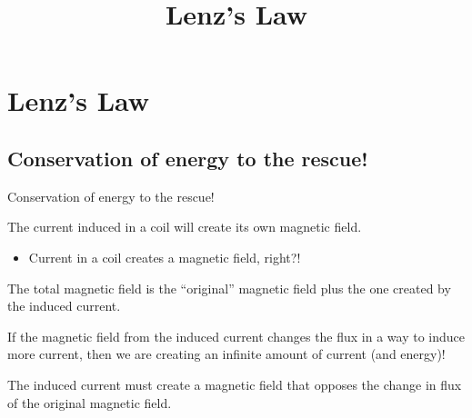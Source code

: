 \documentclass[aspectratio=169,
hyperref={colorlinks,urlcolor=blue}
]{beamer}
\begin{document}






\section{Lenz's Law}
\label{sec:lenzslaw}
\title{Lenz's Law}


\begin{frame}
\titlepage
\thispagestyle{empty}
\end{frame}













\subsection{Conservation of energy to the rescue!}
\label{subsec:conservationofenergytotherescue}
\begin{bulletframe}{Conservation of energy to the rescue!}
\item The current induced in a coil will create its own magnetic field.
\begin{itemize}
\item Current in a coil creates a magnetic field, right?!
\end{itemize}
\item The total magnetic field is the ``original'' magnetic field plus the one created by the induced current.
\item[$\rightarrow$] If the magnetic field from the induced current changes the flux in a way to induce more current, then we are creating an infinite amount of current (and energy)! 
\item[$\rightarrow$] The induced current must create a magnetic field that opposes the change in flux of the original magnetic field.
\end{bulletframe}






\end{document}
